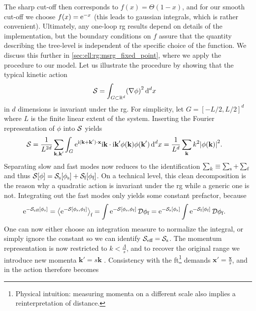 The sharp cut-off then corresponds to $f(x)=\Theta(1-x)$, and for our smooth cut-off we choose $f(x)=\powe{-x}$ (this leads to gaussian integrals, which is rather convenient).
Ultimately, any one-loop \gls{rg} results depend on details of the implementation, but the boundary conditions on $f$ assure that the quantity describing the tree-level is independent of the specific choice of the function.
We discuss this further in \autoref{sec:ell:rg:msrg_fixed_point}, where we apply the procedure to our model.
Let us illustrate the procedure by showing that the typical kinetic action \cite[]{Fradkin_2013}
\begin{align*}
\sact &= \int_{G\subset \mathbb{R}^d} \kla*{\nabla\phi}^2 \,\d^dx
\end{align*}
in $d$ dimensions is invariant under the \gls{rg}.
For simplicity, let $G=[-L/2, L/2]^d$ where $L$ is the finite linear extent of the system.
Inserting the Fourier representation of $\phi$ into $\sact$ yields
\begin{align*}
\sact &= \frac{1}{L^{2d}} \sum_{\textbf{k},\textbf{k}'} \int_G \powe{\i (\textbf{k}+\textbf{k}')\cdot \textbf{x}} \i \textbf{k} \cdot \i \textbf{k}' \phi(\textbf{k}) \phi(\textbf{k}')\,\d^dx = \frac{1}{L^d} \sum_\textbf{k} k^2 \abs*{\phi(\textbf{k})}^2.
\end{align*}
Separating slow and fast modes now reduces to the identification $\sum_k \equiv \sum_\s + \sum_\f$ and thus $\sact[\phi] = \sact_{\s}[\phi_\s] + \sact_{\f}[\phi_\f]$.
On a technical level, this clean decomposition is the reason why a quadratic action is invariant under the \gls{rg} while a generic one is not.
Integrating out the fast modes only yields some constant prefactor, because
\begin{align*}
\powe{-\sact_\eff[\phi_\s]} &= \bra[\big]{\powe{-\sact[\phi_\s, \phi_\f]}}_\f = \int \powe{-\sact[\phi_\s, \phi_\f]}\,\mathcal{D}\phi_\f = \powe{-\sact_{\s}[\phi_\s]} \int \powe{- \sact_{\f}[\phi_\f]}\,\mathcal{D}\phi_\f.
\end{align*}
One can now either choose an integration measure to normalize the integral, or simply ignore the constant so we can identify $\sact_\eff = \sact_\s$.
The momentum representation is now restricted to $k< \frac{\Lambda}{s}$, and to recover the original range we introduce new momenta $\textbf{k}'=s\textbf{k}$ \cite[.4]{QFT_RG_Fradkin_2021}.
Consistency with the \gls{ft}\footnote{Physical intuition: measuring momenta on a different scale also implies a reinterpretation of distance.} demands $\textbf{x}'=\frac{\textbf{x}}{s}$, and in \trspace{} the action therefore becomes
